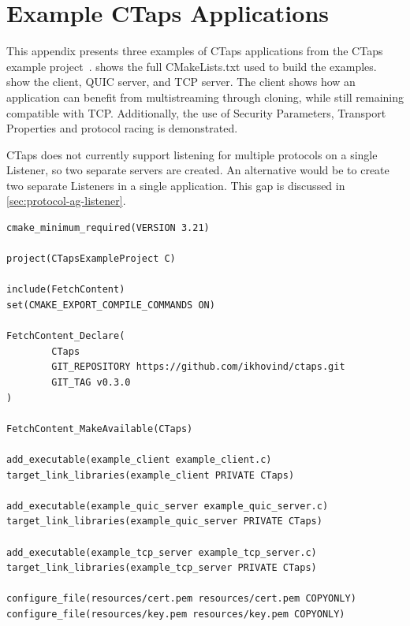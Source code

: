 \chapter{Example CTaps Applications}\label{app:ex-ctaps-apps}
This appendix presents three examples of CTaps applications from the CTaps example
project~\cite{ctaps-example-project}.  shows the full
CMakeLists.txt used to build the examples.  show the client,
QUIC server, and TCP server. The client shows how
an application can benefit from multistreaming through cloning,
while still remaining compatible with TCP.
Additionally, the use of Security Parameters, Transport Properties
and protocol racing is demonstrated.

CTaps does not currently support listening for multiple protocols on a single
Listener, so two separate servers are created. An alternative would be
to create two separate Listeners in a single application. This gap is
discussed in \cref{sec:protocol-ag-listener}.
\begin{listing}[htbp]
    \begin{verbatim}
cmake_minimum_required(VERSION 3.21)

project(CTapsExampleProject C)

include(FetchContent)
set(CMAKE_EXPORT_COMPILE_COMMANDS ON)

FetchContent_Declare(
        CTaps
        GIT_REPOSITORY https://github.com/ikhovind/ctaps.git
        GIT_TAG v0.3.0
)

FetchContent_MakeAvailable(CTaps)

add_executable(example_client example_client.c)
target_link_libraries(example_client PRIVATE CTaps)

add_executable(example_quic_server example_quic_server.c)
target_link_libraries(example_quic_server PRIVATE CTaps)

add_executable(example_tcp_server example_tcp_server.c)
target_link_libraries(example_tcp_server PRIVATE CTaps)

configure_file(resources/cert.pem resources/cert.pem COPYONLY)
configure_file(resources/key.pem resources/key.pem COPYONLY)
    \end{verbatim}
    \caption[CTaps application CMakeLists.txt]
    {
        Full example CMakeLists.txt for an application
        fetching CTaps as a dependency through FetchContent.
        Taken from the CTaps example project~\cite{ctaps-example-project}.
    }
    \label{lst:ctaps-cmakelists}
\end{listing}
